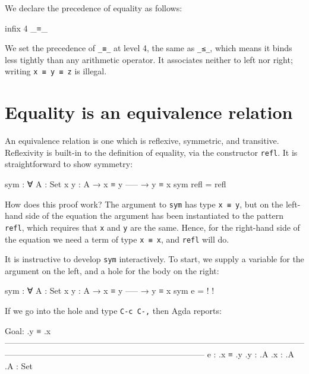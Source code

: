 We declare the precedence of equality as follows:

\begin{fence}
\begin{code}
infix 4 _≡_
\end{code}
\end{fence}

We set the precedence of \texttt{\_≡\_} at level 4, the same as
\texttt{\_≤\_}, which means it binds less tightly than any arithmetic
operator. It associates neither to left nor right; writing
\texttt{x\ ≡\ y\ ≡\ z} is illegal.

\hypertarget{equality-is-an-equivalence-relation}{%
\section{Equality is an equivalence
relation}\label{equality-is-an-equivalence-relation}}

An equivalence relation is one which is reflexive, symmetric, and
transitive. Reflexivity is built-in to the definition of equality, via
the constructor \texttt{refl}. It is straightforward to show symmetry:

\begin{fence}
\begin{code}
sym : ∀ {A : Set} {x y : A}
  → x ≡ y
    -----
  → y ≡ x
sym refl = refl
\end{code}
\end{fence}

How does this proof work? The argument to \texttt{sym} has type
\texttt{x\ ≡\ y}, but on the left-hand side of the equation the argument
has been instantiated to the pattern \texttt{refl}, which requires that
\texttt{x} and \texttt{y} are the same. Hence, for the right-hand side
of the equation we need a term of type \texttt{x\ ≡\ x}, and
\texttt{refl} will do.

It is instructive to develop \texttt{sym} interactively. To start, we
supply a variable for the argument on the left, and a hole for the body
on the right:

\begin{myDisplay}
sym : ∀ {A : Set} {x y : A}
  → x ≡ y
    -----
  → y ≡ x
sym e = {! !}
\end{myDisplay}

If we go into the hole and type \texttt{C-c\ C-,} then Agda reports:

\begin{myDisplay}
Goal: .y ≡ .x
————————————————————————————————————————————————————————————
e  : .x ≡ .y
.y : .A
.x : .A
.A : Set
\end{myDisplay}

